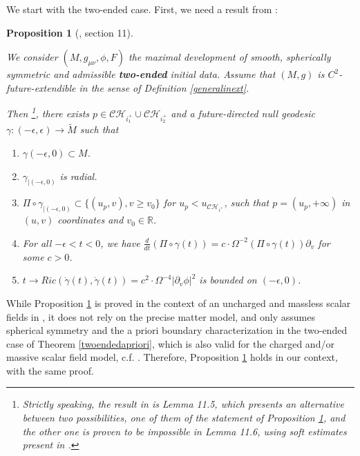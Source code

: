 \documentclass[10pt,a4paper]{article}
\theoremstyle{plain}
\newtheorem{prop}[thm]{Proposition}
\theoremstyle{remark}
\theoremstyle{definition}
\newcommand{\RR}{\mathbb{R}}
\theoremstyle{plain}
\theoremstyle{remark}
\theoremstyle{definition}
\newcommand{\CH}{\mathcal{CH}_{i^+}}
\numberwithin{equation}{section}
\begin{document}
We start with the two-ended case. First, we need a result from \cite{JonathanStab}: \begin{prop}[\cite{JonathanStab}, section 11] \label{geomextendJonathan}
	
	We consider $(M,g_{\mu \nu}, \phi,F)$ the maximal development of smooth, spherically symmetric and admissible \textbf{two-ended} initial data.	Assume that $(M,g)$ is $C^2$-future-extendible in the sense of Definition \ref{generalinext}.
	
	Then \footnote{Strictly speaking, the result in \cite{JonathanStab} is Lemma 11.5, which presents an alternative between two possibilities, one of them of the statement of Proposition \ref{geomextendJonathan}, and the other one is proven to be impossible in Lemma 11.6, using soft estimates present in \cite{Kommemi}.}, there exists $p \in \mathcal{CH}_{i^+_1} \cup \mathcal{CH}_{i^+_2}$ and a future-directed null geodesic $\gamma:(-\epsilon,\epsilon) \rightarrow \tilde{M}$ such that  \begin{enumerate}
		\item $\gamma(-\epsilon,0) \subset M$.
		\item $\gamma_{|(-\epsilon,0)}$ is radial.
		\item  $\Pi \circ \gamma_{|(-\epsilon,0)} \subset \{ (u_p,v), v \geq v_0\}$ for $u_p<u_{\CH}$, such that $p=(u_p,+\infty)$ in $(u,v)$ coordinates and $v_0 \in \RR$.
		\item For all $-\epsilon < t <0$, we have $\frac{d}{dt}(\Pi \circ \gamma(t))=c  \cdot \Omega^{-2}(\Pi \circ \gamma(t)) \partial_v$ for some $c>0$.
		
		\item  \label{Riccibounded1} $t \rightarrow Ric(\dot{\gamma}(t),\dot{\gamma}(t))= c^2 \cdot \Omega^{-4} |\partial_v \phi|^2$ is bounded on $(-\epsilon,0)$.
	\end{enumerate} 
	
	
	
	
\end{prop}
While Proposition \ref{geomextendJonathan} is proved in the context of an uncharged and massless scalar fields in \cite{JonathanStab}, it does not rely on the precise matter model, and only assumes spherical symmetry and the a priori boundary characterization in the two-ended case of Theorem \ref{twoendedapriori}, which is also valid for the charged and/or massive scalar field model, c.f. \cite{Kommemi}. Therefore, Proposition \ref{geomextendJonathan} holds in our context, with the same proof.
\end{document}
